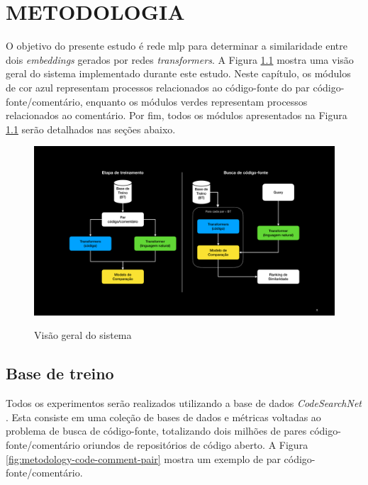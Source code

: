 \chapter{METODOLOGIA}
\label{chp:methodology}
\graphicspath{ {./imagens/metodologia} }

O objetivo do presente estudo é rede \gls{mlp} para determinar a similaridade entre dois \textit{embeddings} gerados por redes \textit{transformers}. A Figura \ref{fig:metodology-system_overview} mostra uma visão geral do sistema implementado durante este estudo. Neste capítulo, os módulos de cor azul representam processos relacionados ao código-fonte do par código-fonte/comentário, enquanto os módulos verdes representam processos relacionados ao comentário. Por fim, todos os módulos apresentados na Figura \ref{fig:metodology-system_overview} serão detalhados nas seções abaixo.

\begin{figure}[H]
    \centering
        \caption{Visão geral do sistema}
        \includegraphics[scale=0.3]{system-overview.pdf}
        \label{fig:metodology-system_overview}
\end{figure}

\section{Base de treino}
Todos os experimentos serão realizados utilizando a base de dados \textit{CodeSearchNet} \cite{Husain2019CodeSearchNetCE}. Esta consiste em uma coleção de bases de dados e métricas voltadas ao problema de busca de código-fonte, totalizando dois milhões de pares código-fonte/comentário oriundos de repositórios de código aberto. A Figura \ref{fig:metodology-code-comment-pair} mostra um exemplo de par código-fonte/comentário.

